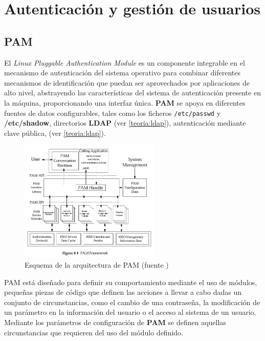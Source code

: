 \section{Autenticación y gestión de usuarios}
\subsection{PAM}

El \textit{Linux Pluggable Authentication Module}\cite{opengroup:rfc86.0} es un componente integrable en el mecanismo de autenticación del sistema operativo para combinar diferentes mecanismos de identificación que puedan ser aprovechados por aplicaciones de alto nivel, abstrayendo las características del sistema de autenticación presente en la máquina, proporcionando una interfaz única. \textbf{PAM} se apoya en diferentes fuentes de datos configurables, tales como los ficheros \texttt{/etc/passwd} y \textbf{/etc/shadow}, directorios \textbf{LDAP} (ver \ref{teoria:ldap}), autenticación mediante clave pública, (ver \ref{teoria:ldap}).

\begin{figure}[H]
\centering
  \includegraphics[width=0.6\textwidth]{Chapter2/Figures/pamstructure.png}
  \caption[Esquema de la arquitectura de PAM]{Esquema de la arquitectura de PAM (fuente \cite{opengroup:rfc86.0})}
\end{figure}

PAM está diseñado para definir su comportamiento mediante el uso de módulos, pequeñas piezas de código que definen las acciones a llevar a cabo dadas un conjunto de circunstancias, como el cambio de una contraseña, la modificación de un parámetro en la información del usuario o el acceso al sistema de un usuario. Mediante los parámetros de configuración de \textbf{PAM} se definen aquellas circunstancias que requieren del uso del módulo definido.

